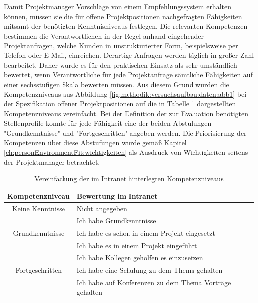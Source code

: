 Damit Projektmanager Vorschläge von einem Empfehlungssystem erhalten können, müssen sie die für offene Projektpositionen nachgefragten Fähigkeiten mitsamt der benötigten Kenntnisniveaus festlegen. Die relevanten Kompetenzen bestimmen die Verantwortlichen in der Regel anhand eingehender Projektanfragen, welche Kunden in unstrukturierter Form, beispielsweise per Telefon oder E-Mail, einreichen. Derartige Anfragen werden täglich in großer Zahl bearbeitet. Daher wurde es für den praktischen Einsatz als sehr umständlich bewertet, wenn Verantwortliche für jede Projektanfrage sämtliche Fähigkeiten auf einer sechsstufigen Skala bewerten müssen. Aus diesem Grund wurden die Kompetenzniveaus aus Abbildung \ref{fig:methodik:versuchsaufbau:daten:abb1} bei der Spezifikation offener Projektpositionen auf die in Tabelle \ref{tbl:methodik:versuchsaufbau:systemarchitektur:matrixservice:tbl1} dargestellten Kompetenzniveaus vereinfacht. Bei der Definition der zur Evaluation benötigten Stellenprofile konnte für jede Fähigkeit eine der beiden Abstufungen "Grundkenntnisse" und "Fortgeschritten" angeben werden. Die Priorisierung der Kompetenzen über diese Abstufungen wurde gemäß Kapitel \ref{ch:personEnvironmentFit:wichtigkeiten} als Ausdruck von Wichtigkeiten seitens der Projektmanager betrachtet.

\begin{table}[h]
	\centering
	\begin{tabularx}{\textwidth}{c|X}
		\textbf{Kompetenzniveau} & \textbf{Bewertung im Intranet}\\
		\hline
		Keine Kenntnisse & Nicht angegeben\\
		\hline
		& Ich habe Grundkenntnisse\\
		Grundkenntnisse & Ich habe es schon in einem Projekt eingesetzt\\
		& Ich habe es in einem Projekt eingeführt\\
		\hline
		& Ich habe Kollegen geholfen es einzusetzen\\
		Fortgeschritten & Ich habe eine Schulung zu dem Thema gehalten\\
		& Ich habe auf Konferenzen zu dem Thema Vorträge gehalten\\
		\hline
	\end{tabularx}
	\caption{Vereinfachung der im Intranet hinterlegten Kompetenzniveaus}
	\label{tbl:methodik:versuchsaufbau:systemarchitektur:matrixservice:tbl1}
\end{table}


